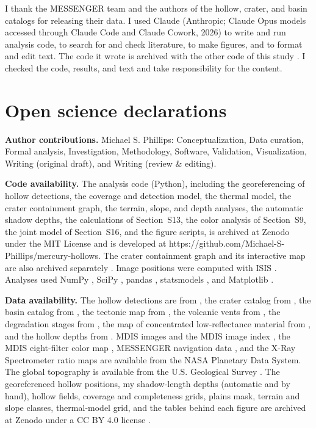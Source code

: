 \documentclass[article,review]{planetary}
\begin{document}
I thank the MESSENGER team and the authors of the hollow, crater, and basin catalogs for releasing their data. I used Claude (Anthropic; Claude Opus models accessed through Claude Code and Claude Cowork, 2026) to write and run analysis code, to search for and check literature, to make figures, and to format and edit text. The code it wrote is archived with the other code of this study \parencite{zenodo_this}. I checked the code, results, and text and take responsibility for the content.

\section*{Open science declarations}

\noindent\textbf{Author contributions.} Michael S. Phillips: Conceptualization, Data curation, Formal analysis, Investigation, Methodology, Software, Validation, Visualization, Writing (original draft), and Writing (review \& editing).

\noindent\textbf{Code availability.} The analysis code (Python), including the georeferencing of hollow detections, the coverage and detection model, the thermal model, the crater containment graph, the terrain, slope, and depth analyses, the automatic shadow depths, the calculations of Section~S13, the color analysis of Section~S9, the joint model of Section~S16, and the figure scripts, is archived at Zenodo \parencite{zenodo_this} under the MIT License and is developed at https://github.com/Michael-S-Phillips/mercury-hollows. The crater containment graph and its interactive map are also archived separately \parencite{zenodo_cratergraph}. Image positions were computed with ISIS \parencite{isis2023}. Analyses used NumPy \parencite{harris2020}, SciPy \parencite{virtanen2020}, pandas \parencite{mckinney2010}, statsmodels \parencite{seabold2010}, and Matplotlib \parencite{hunter2007}.

\noindent\textbf{Data availability.} The hollow detections are from \textcite{bickel2025}, the crater catalog from \textcite{herrick2018}, the basin catalog from \textcite{orgel2020}, the tectonic map from \textcite{klimczak2025data}, the volcanic vents from \textcite{pegg2021}, the degradation stages from \textcite{deutsch2025}, the map of concentrated low-reflectance material from \textcite{klima2018}, and the hollow depths from \textcite{blewett2016}. MDIS images and the MDIS image index \parencite{mdis_cdr}, the MDIS eight-filter color map \parencite{mdis_mdr}, MESSENGER navigation data \parencite{spice_messenger}, and the X-Ray Spectrometer ratio maps \parencite{xrs_maps} are available from the NASA Planetary Data System. The global topography is available from the U.S. Geological Survey \parencite{usgs_dem}. The georeferenced hollow positions, my shadow-length depths (automatic and by hand), hollow fields, coverage and completeness grids, plains mask, terrain and slope classes, thermal-model grid, and the tables behind each figure are archived at Zenodo under a CC BY 4.0 license \parencite{zenodo_this}.
\end{document}
